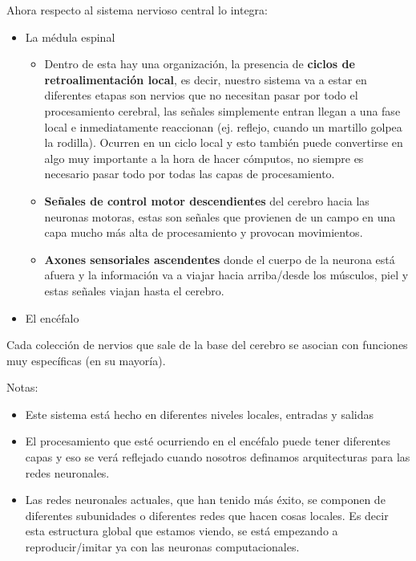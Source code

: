 Ahora respecto al sistema nervioso central lo integra:

\begin{itemize}
 \item La médula espinal
    \begin{itemize}
     \item Dentro de esta hay una organización, la presencia de \textbf{ciclos de retroalimentación local}, es decir, nuestro sistema va a estar en diferentes etapas son nervios que no necesitan pasar por todo el procesamiento cerebral, las señales simplemente entran llegan a una fase local e inmediatamente reaccionan (ej. reflejo, cuando un martillo golpea la rodilla). Ocurren en un ciclo local y esto también puede convertirse en algo muy importante a la hora de hacer cómputos, no siempre es necesario pasar todo por todas las capas de procesamiento. 
     \item \textbf{Señales de control motor descendientes} del cerebro hacia las neuronas motoras, estas son señales que provienen de un campo en una capa mucho más alta de procesamiento y provocan movimientos.

     \item \textbf{Axones sensoriales ascendentes} donde el cuerpo de la neurona está afuera y la información va a viajar hacia arriba/desde los músculos, piel y  estas señales viajan hasta el cerebro. 
    \end{itemize}

 \item El encéfalo
\end{itemize}

 Cada colección de nervios que sale de la base del cerebro se asocian con funciones muy específicas (en su mayoría). 
 
 Notas:
 
 \begin{itemize}
  \item Este sistema está hecho en diferentes niveles locales, entradas y salidas  
  \item El procesamiento que esté ocurriendo en el encéfalo puede tener diferentes capas y eso se verá reflejado cuando nosotros definamos arquitecturas para las redes neuronales. 
  \item Las redes neuronales actuales, que han tenido más éxito, se componen de diferentes subunidades o diferentes redes que hacen cosas locales. Es decir esta estructura global que estamos viendo,  se está empezando a reproducir/imitar ya con las neuronas computacionales.

 \end{itemize}



